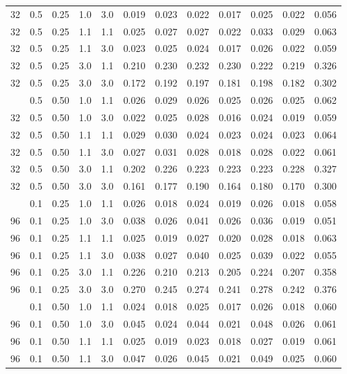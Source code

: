 \begin{longtable}[t]{cccccrrrrrrc}
32 & 0.5 & 0.25 & 1.0 & 3.0 & 0.019 & 0.023 & 0.022 & 0.017 & 0.025 & 0.022 & 0.056\\
32 & 0.5 & 0.25 & 1.1 & 1.1 & 0.025 & 0.027 & 0.027 & 0.022 & 0.033 & 0.029 & 0.063\\
32 & 0.5 & 0.25 & 1.1 & 3.0 & 0.023 & 0.025 & 0.024 & 0.017 & 0.026 & 0.022 & 0.059\\
32 & 0.5 & 0.25 & 3.0 & 1.1 & 0.210 & 0.230 & 0.232 & 0.230 & 0.222 & 0.219 & 0.326\\
32 & 0.5 & 0.25 & 3.0 & 3.0 & 0.172 & 0.192 & 0.197 & 0.181 & 0.198 & 0.182 & 0.302\\
\addlinespace
32 & 0.5 & 0.50 & 1.0 & 1.1 & 0.026 & 0.029 & 0.026 & 0.025 & 0.026 & 0.025 & 0.062\\
32 & 0.5 & 0.50 & 1.0 & 3.0 & 0.022 & 0.025 & 0.028 & 0.016 & 0.024 & 0.019 & 0.059\\
32 & 0.5 & 0.50 & 1.1 & 1.1 & 0.029 & 0.030 & 0.024 & 0.023 & 0.024 & 0.023 & 0.064\\
32 & 0.5 & 0.50 & 1.1 & 3.0 & 0.027 & 0.031 & 0.028 & 0.018 & 0.028 & 0.022 & 0.061\\
32 & 0.5 & 0.50 & 3.0 & 1.1 & 0.202 & 0.226 & 0.223 & 0.223 & 0.223 & 0.228 & 0.327\\
32 & 0.5 & 0.50 & 3.0 & 3.0 & 0.161 & 0.177 & 0.190 & 0.164 & 0.180 & 0.170 & 0.300\\
\addlinespace
96 & 0.1 & 0.25 & 1.0 & 1.1 & 0.026 & 0.018 & 0.024 & 0.019 & 0.026 & 0.018 & 0.058\\
96 & 0.1 & 0.25 & 1.0 & 3.0 & 0.038 & 0.026 & 0.041 & 0.026 & 0.036 & 0.019 & 0.051\\
96 & 0.1 & 0.25 & 1.1 & 1.1 & 0.025 & 0.019 & 0.027 & 0.020 & 0.028 & 0.018 & 0.063\\
96 & 0.1 & 0.25 & 1.1 & 3.0 & 0.038 & 0.027 & 0.040 & 0.025 & 0.039 & 0.022 & 0.055\\
96 & 0.1 & 0.25 & 3.0 & 1.1 & 0.226 & 0.210 & 0.213 & 0.205 & 0.224 & 0.207 & 0.358\\
96 & 0.1 & 0.25 & 3.0 & 3.0 & 0.270 & 0.245 & 0.274 & 0.241 & 0.278 & 0.242 & 0.376\\
\addlinespace
96 & 0.1 & 0.50 & 1.0 & 1.1 & 0.024 & 0.018 & 0.025 & 0.017 & 0.026 & 0.018 & 0.060\\
96 & 0.1 & 0.50 & 1.0 & 3.0 & 0.045 & 0.024 & 0.044 & 0.021 & 0.048 & 0.026 & 0.061\\
96 & 0.1 & 0.50 & 1.1 & 1.1 & 0.025 & 0.019 & 0.023 & 0.018 & 0.027 & 0.019 & 0.061\\
96 & 0.1 & 0.50 & 1.1 & 3.0 & 0.047 & 0.026 & 0.045 & 0.021 & 0.049 & 0.025 & 0.060\\

\end{longtable}
